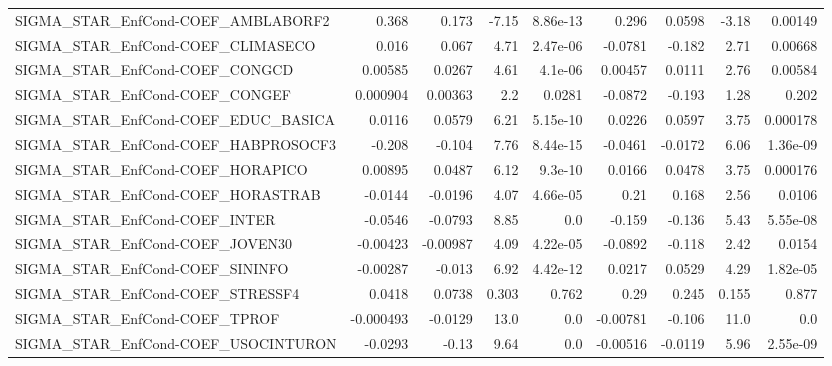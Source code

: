 \begin{tabular}{lrrrrrrrr}
SIGMA\_STAR\_EnfCond-COEF\_AMBLABORF2     &       0.368 &        0.173 &    -7.15 & 8.86e-13 &      0.296 &      0.0598 &        -3.18 &       0.00149 \\
SIGMA\_STAR\_EnfCond-COEF\_CLIMASECO      &       0.016 &        0.067 &     4.71 & 2.47e-06 &    -0.0781 &      -0.182 &         2.71 &       0.00668 \\
SIGMA\_STAR\_EnfCond-COEF\_CONGCD         &     0.00585 &       0.0267 &     4.61 &  4.1e-06 &    0.00457 &      0.0111 &         2.76 &       0.00584 \\
SIGMA\_STAR\_EnfCond-COEF\_CONGEF         &    0.000904 &      0.00363 &      2.2 &   0.0281 &    -0.0872 &      -0.193 &         1.28 &         0.202 \\
SIGMA\_STAR\_EnfCond-COEF\_EDUC\_BASICA    &      0.0116 &       0.0579 &     6.21 & 5.15e-10 &     0.0226 &      0.0597 &         3.75 &      0.000178 \\
SIGMA\_STAR\_EnfCond-COEF\_HABPROSOCF3    &      -0.208 &       -0.104 &     7.76 & 8.44e-15 &    -0.0461 &     -0.0172 &         6.06 &      1.36e-09 \\
SIGMA\_STAR\_EnfCond-COEF\_HORAPICO       &     0.00895 &       0.0487 &     6.12 &  9.3e-10 &     0.0166 &      0.0478 &         3.75 &      0.000176 \\
SIGMA\_STAR\_EnfCond-COEF\_HORASTRAB      &     -0.0144 &      -0.0196 &     4.07 & 4.66e-05 &       0.21 &       0.168 &         2.56 &        0.0106 \\
SIGMA\_STAR\_EnfCond-COEF\_INTER          &     -0.0546 &      -0.0793 &     8.85 &      0.0 &     -0.159 &      -0.136 &         5.43 &      5.55e-08 \\
SIGMA\_STAR\_EnfCond-COEF\_JOVEN30        &    -0.00423 &     -0.00987 &     4.09 & 4.22e-05 &    -0.0892 &      -0.118 &         2.42 &        0.0154 \\
SIGMA\_STAR\_EnfCond-COEF\_SININFO        &    -0.00287 &       -0.013 &     6.92 & 4.42e-12 &     0.0217 &      0.0529 &         4.29 &      1.82e-05 \\
SIGMA\_STAR\_EnfCond-COEF\_STRESSF4       &      0.0418 &       0.0738 &    0.303 &    0.762 &       0.29 &       0.245 &        0.155 &         0.877 \\
SIGMA\_STAR\_EnfCond-COEF\_TPROF          &   -0.000493 &      -0.0129 &     13.0 &      0.0 &   -0.00781 &      -0.106 &         11.0 &           0.0 \\
SIGMA\_STAR\_EnfCond-COEF\_USOCINTURON    &     -0.0293 &        -0.13 &     9.64 &      0.0 &   -0.00516 &     -0.0119 &         5.96 &      2.55e-09 \\

\end{tabular}
